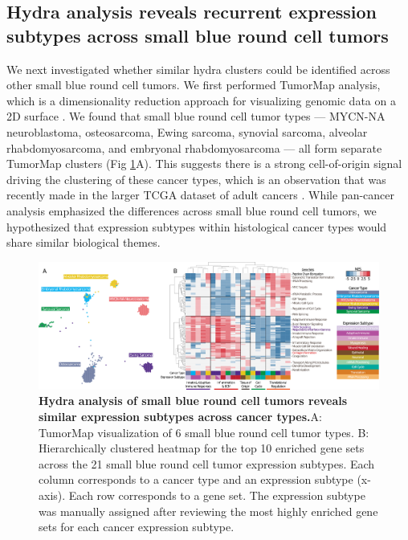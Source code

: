 \documentclass[10pt,letterpaper]{article}
\begin{document}
\subsection*{Hydra analysis reveals recurrent expression subtypes across small blue round cell tumors}
We next investigated whether similar hydra clusters could be identified across other small blue round cell tumors. We first performed TumorMap analysis, which is a dimensionality reduction approach for visualizing genomic data on a 2D surface \cite{newtonTumorMapExploringMolecular2017}. We found that small blue round cell tumor types --- MYCN-NA neuroblastoma, osteosarcoma, Ewing sarcoma, synovial sarcoma, alveolar rhabdomyosarcoma, and embryonal rhabdomyosarcoma --- all form separate TumorMap clusters (Fig \ref{pancan}A). This suggests there is a strong cell-of-origin signal driving the clustering of these cancer types, which is an observation that was recently made in the larger TCGA dataset of adult cancers \cite{hoadleyCellofOriginPatternsDominate2018}. While pan-cancer analysis emphasized the differences across small blue round cell tumors, we hypothesized that expression subtypes within histological cancer types would share similar biological themes.

\begin{figure}[!h]
	\includegraphics[width=1.05\textwidth]{img/PNG/pan-cancer-figure-V4}
	\caption{{\bf Hydra analysis of small blue round cell tumors reveals similar expression subtypes across cancer types.}A: TumorMap visualization of 6 small blue round cell tumor types. B: Hierarchically clustered heatmap for the top 10 enriched gene sets across the 21 small blue round cell tumor expression subtypes. Each column corresponds to a cancer type and an expression subtype (x-axis). Each row corresponds to a gene set. The expression subtype was manually assigned after reviewing the most highly enriched gene sets for each cancer expression subtype.}
	\label{pancan}
\end{figure}
\end{document}
